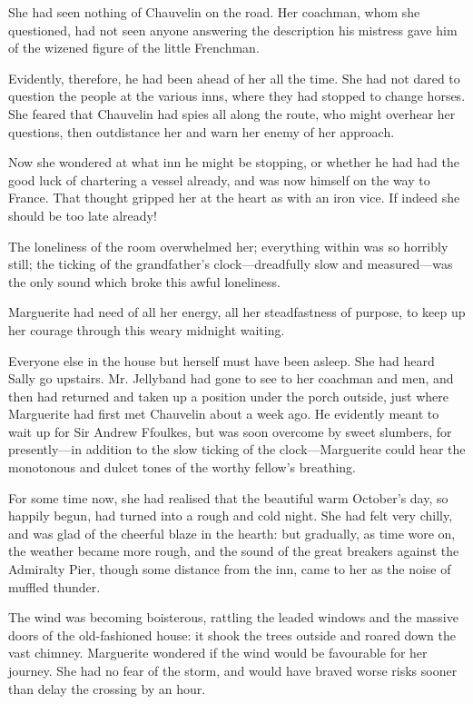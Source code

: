 \documentclass[paper=a5,BCOR=7mm,twoside,DIV=calc,12pt,usegeometry,chapterprefix,endperiod,headings=big]{scrbook}
\begin{document}
She had seen nothing of Chauvelin on the road. Her coachman, whom she questioned, had not seen anyone answering the description his mistress gave him of the wizened figure of the little Frenchman.

Evidently, therefore, he had been ahead of her all the time. She had not dared to question the people at the various inns, where they had stopped to change horses. She feared that Chauvelin had spies all along the route, who might overhear her questions, then outdistance her and warn her enemy of her approach.

Now she wondered at what inn he might be stopping, or whether he had had the good luck of chartering a vessel already, and was now himself on the way to France. That thought gripped her at the heart as with an iron vice. If indeed she should be too late already!

The loneliness of the room overwhelmed her; everything within was so horribly still; the ticking of the grandfather's clock---dreadfully slow and measured---was the only sound which broke this awful loneliness.

Marguerite had need of all her energy, all her steadfastness of purpose, to keep up her courage through this weary midnight waiting.

Everyone else in the house but herself must have been asleep. She had heard Sally go upstairs. Mr. Jellyband had gone to see to her coachman and men, and then had returned and taken up a position under the porch outside, just where Marguerite had first met Chauvelin about a week ago. He evidently meant to wait up for Sir Andrew Ffoulkes, but was soon overcome by sweet slumbers, for presently---in addition to the slow ticking of the clock---Marguerite could hear the monotonous and dulcet tones of the worthy fellow's breathing.

For some time now, she had realised that the beautiful warm October's day, so happily begun, had turned into a rough and cold night. She had felt very chilly, and was glad of the cheerful blaze in the hearth: but gradually, as time wore on, the weather became more rough, and the sound of the great breakers against the Admiralty Pier, though some distance from the inn, came to her as the noise of muffled thunder.

The wind was becoming boisterous, rattling the leaded windows and the massive doors of the old-fashioned house: it shook the trees outside and roared down the vast chimney. Marguerite wondered if the wind would be favourable for her journey. She had no fear of the storm, and would have braved worse risks sooner than delay the crossing by an hour.
\end{document}
